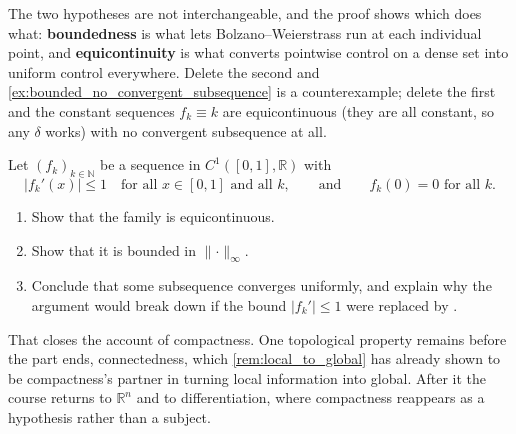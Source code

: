 \begin{remark}
The two hypotheses are not interchangeable, and the proof shows which does what:
\textbf{boundedness} is what lets Bolzano--Weierstrass run at each individual point, and
\textbf{equicontinuity} is what converts pointwise control on a dense set into uniform control
everywhere. Delete the second and \cref{ex:bounded_no_convergent_subsequence} is a
counterexample; delete the first and the constant sequences $f_k \equiv k$ are equicontinuous
(they are all constant, so any $\delta$ works) with no convergent subsequence at all.
\end{remark}

\begin{aiexercise}
\label{ex:uniform_lipschitz_family}
Let $(f_k)_{k\in\mathbb{N}}$ be a sequence in $C^1([0,1],\mathbb{R})$ with
\[\lvert f_k'(x)\rvert \leq 1 \quad \text{for all } x \in [0,1] \text{ and all } k,
  \qquad\text{and}\qquad f_k(0) = 0 \text{ for all } k.\]
\begin{enumerate}[label=\textbf{(\alph*)}]
  \item Show that the family is equicontinuous.
  \item Show that it is bounded in $\lVert\cdot\rVert_\infty$.
  \item Conclude that some subsequence converges uniformly, and explain why the argument would
    break down if the bound $\lvert f_k'\rvert \leq 1$ were replaced by .
\end{enumerate}
\end{aiexercise}

That closes the account of compactness. One topological property remains before the part ends,
connectedness, which \cref{rem:local_to_global} has already shown to be compactness's partner in
turning local information into global. After it the course returns to $\mathbb{R}^n$ and to
differentiation, where compactness reappears as a hypothesis rather than a subject.

